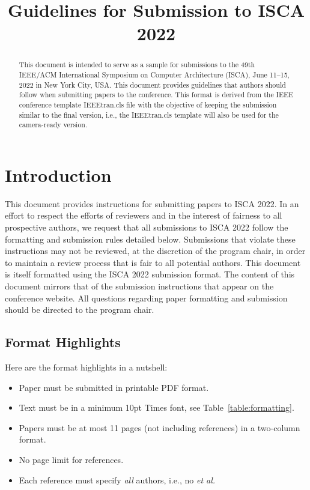 \documentclass[conference]{IEEEtran}
\title{Guidelines for Submission to ISCA 2022}
\author{}
\begin{document}
\maketitle
\thispagestyle{firstpage}
\pagestyle{plain}




\begin{abstract}

This document is intended to serve as a sample for submissions to the
49th IEEE/ACM International Symposium on Computer Architecture (ISCA),
June 11--15, 2022 in New York City, USA. This document provides
guidelines that authors should follow when submitting papers to the
conference. This format is derived from the IEEE conference template IEEEtran.cls
file with the objective of keeping the submission similar to the final
version, i.e., the IEEEtran.cls template will also be used for
the camera-ready version.

\end{abstract}

\section{Introduction}

This document provides instructions for submitting papers to ISCA
2022. In an effort to respect the efforts of reviewers and in the
interest of fairness to all prospective authors, we request that all
submissions to ISCA 2022 follow the formatting and submission rules
detailed below. Submissions that violate these instructions may not be
reviewed, at the discretion of the program chair, in order to
maintain a review process that is fair to all potential authors. This
document is itself formatted using the ISCA 2022 submission format. The
content of this document mirrors that of the submission instructions
that appear on the conference website. All questions regarding paper
formatting and submission should be directed to the program chair.

\subsection{Format Highlights}

Here are the format highlights in a nutshell:
\begin{itemize}
\item Paper must be submitted in printable PDF format.
\item Text must be in a minimum 10pt Times font, see Table~\ref{table:formatting}.
\item Papers must be at most 11 pages (not including references) in a
  two-column format.
\item No page limit for references.
\item Each reference must specify {\em all} authors, i.e., no {\em et al.}
\end{itemize}
\end{document}
